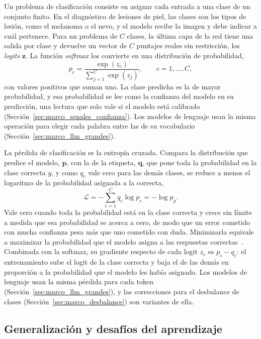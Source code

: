 Un problema de clasificación consiste en asignar cada entrada a una clase de un conjunto finito. En el diagnóstico de lesiones de piel, las clases son los tipos de lesión, como el
melanoma o el nevo, y el modelo recibe la imagen y debe indicar a cuál pertenece. Para un problema de $C$
clases, la última capa de la red tiene una salida por clase y devuelve un vector de $C$ puntajes reales sin
restricción, los \emph{logits} $\mathbf{z}$. La función \emph{softmax} los convierte en una distribución de
probabilidad,
\begin{equation}
    p_c = \frac{\exp(z_c)}{\sum_{j=1}^{C} \exp(z_j)}, \qquad c = 1, \dots, C,
    \label{eq:marco_softmax}
\end{equation}
con valores positivos que suman uno. La clase predicha es la de mayor probabilidad, y esa probabilidad se lee
como la confianza del modelo en su predicción, una lectura que solo vale si el modelo está calibrado
(Sección~\ref{sec:marco_senales_confianza}). Los modelos de lenguaje usan la misma operación para elegir cada
palabra entre las de su vocabulario (Sección~\ref{sec:marco_llm_grandes}).

La pérdida de clasificación es la entropía cruzada. Compara la distribución que predice el modelo,
$\mathbf{p}$, con la de la etiqueta, $\mathbf{q}$, que pone toda la probabilidad en la clase correcta $y$, y
como $q_c$ vale cero para las demás clases, se reduce a menos el logaritmo de la probabilidad asignada a la
correcta,
\begin{equation}
    \mathcal{L} = -\sum_{c=1}^{C} q_c \log p_c = -\log p_y.
    \label{eq:marco_entropia}
\end{equation}
Vale cero cuando toda la probabilidad está en la clase correcta y crece sin límite a medida que esa
probabilidad se acerca a cero, de modo que un error cometido con mucha confianza pesa más que uno cometido con
duda. Minimizarla equivale a maximizar la probabilidad que el modelo asigna a las respuestas
correctas~\cite{goodfellow2016deep}. Combinada con la softmax, su gradiente respecto de cada logit $z_c$ es
$p_c - q_c$: el entrenamiento sube el logit de la clase correcta y baja el de las demás en proporción a la
probabilidad que el modelo les había asignado. Los modelos de lenguaje usan la misma pérdida para cada token
(Sección~\ref{sec:marco_llm_grandes}), y las correcciones para el desbalance de clases
(Sección~\ref{sec:marco_desbalance}) son variantes de ella.

\subsection{Generalización y desafíos del aprendizaje}
\label{sec:marco_regularizacion}

